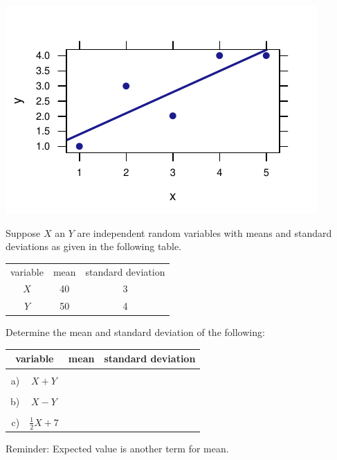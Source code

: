 \documentclass[twoside]{book}\usepackage[]{graphicx}\usepackage[]{xcolor}
\makeatletter
\def\maxwidth{ %
  \ifdim\Gin@nat@width>\linewidth
    \linewidth
  \else
    \Gin@nat@width
  \fi
}
\newenvironment{knitrout}{}{} %
\makeatother
\begin{document}
\begin{solution}
\begin{knitrout}
{\centering \includegraphics[width=\maxwidth]{figures/fig-unnamed-chunk-164-1} 

}



\end{knitrout}
\end{solution}

\begin{problem}
Suppose $X$ an $Y$ are independent random variables with means and 
standard deviations as given in the following table.

\begin{center}
\begin{tabular}{ccc}
variable & mean & standard deviation  \\
$X$ & 40 & 3 \\
$Y$ & 50 & 4 \\
\end{tabular}
\end{center}

Determine the mean and standard deviation of the following:
\begin{center}
\begin{tabular}{|rc|p{2in}|p{2in}|}
\hline
\multicolumn{2}{|c|}{variable} & \multicolumn{1}{c|}{mean} & \multicolumn{1}{c|}{standard deviation}\\[2mm]
\hline
&&& \\
a)& $X + Y$  & & \\[6mm]
\hline
&&& \\
b)& $X - Y$  & & \\[6mm]
\hline
&&& \\
c)& $\frac{1}{2} X + 7$  & & \\[6mm]
\hline
\end{tabular}
\end{center}

Reminder: Expected value is another term for mean.
\end{problem}
\end{document}
